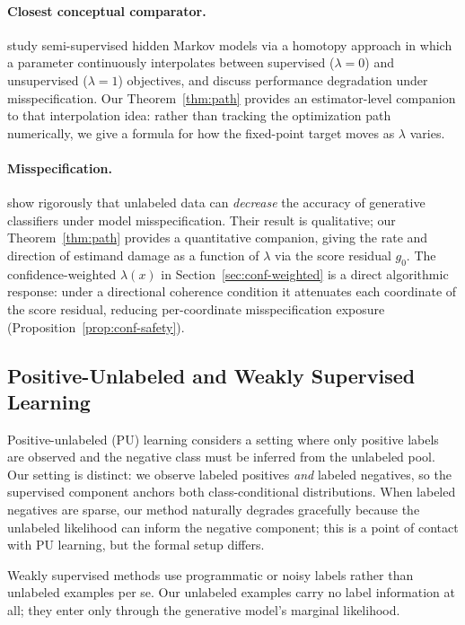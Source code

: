 \documentclass[11pt]{article}
\theoremstyle{definition}
\newcommand{\lam}{\lambda}
\begin{document}
\paragraph{Closest conceptual comparator.}
\citet{ji2009semisupervised} study semi-supervised hidden Markov models
via a homotopy approach in which a parameter continuously interpolates
between supervised (\(\lam=0\)) and unsupervised (\(\lam=1\)) objectives,
and discuss performance degradation under misspecification.
Our Theorem~\ref{thm:path} provides an estimator-level companion to that
interpolation idea: rather than tracking the optimization path numerically,
we give a formula for how the fixed-point target moves as \(\lam\) varies.

\paragraph{Misspecification.}
\citet{cozman2002unlabeled} show rigorously that unlabeled data can
\emph{decrease} the accuracy of generative classifiers under model
misspecification.
Their result is qualitative; our Theorem~\ref{thm:path} provides a
quantitative companion, giving the rate and direction of estimand damage
as a function of \(\lam\) via the score residual \(g_0\).
The confidence-weighted \(\lam(x)\) in Section~\ref{sec:conf-weighted}
is a direct algorithmic response: under a directional coherence condition
it attenuates each coordinate of the score residual, reducing per-coordinate
misspecification exposure (Proposition~\ref{prop:conf-safety}).

\subsection{Positive-Unlabeled and Weakly Supervised Learning}

Positive-unlabeled (PU) learning \citep{liu2002partially, elkan2008learning}
considers a setting where only positive labels are observed and the
negative class must be inferred from the unlabeled pool.
Our setting is distinct: we observe labeled positives \emph{and} labeled
negatives, so the supervised component anchors both class-conditional
distributions.
When labeled negatives are sparse, our method naturally degrades gracefully
because the unlabeled likelihood can inform the negative component;
this is a point of contact with PU learning, but the formal setup differs.

Weakly supervised methods \citep{zhou2018brief, ratner2017snorkel} use
programmatic or noisy labels rather than unlabeled examples per se.
Our unlabeled examples carry no label information at all; they enter
only through the generative model's marginal likelihood.
\end{document}
